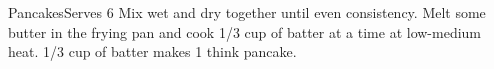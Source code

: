 \documentclass[../cookbook.tex]{subfiles}
\begin{document}
\begin{recipe}{Pancakes}{Serves 6}{}
    Mix wet and dry together until even consistency.
    Melt some butter in the frying pan and cook 1/3
    cup of batter at a time at low-medium heat. 1/3
    cup of batter makes 1 think pancake.
    
\end{recipe}
\end{document}

